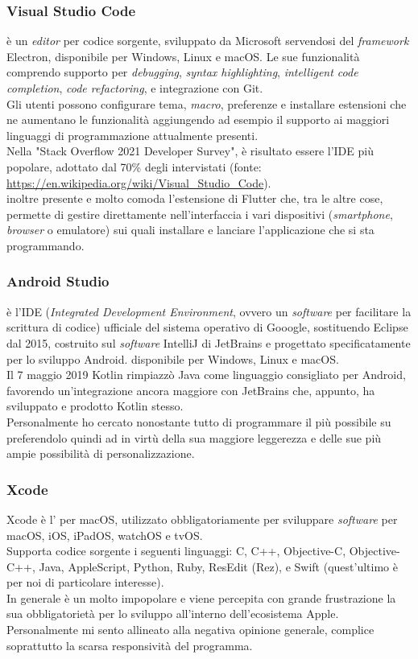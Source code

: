 \subsubsection{Visual Studio Code}
\vsc{} è un \textit{editor} per codice sorgente, sviluppato da Microsoft servendosi del \textit{framework} Electron, disponibile per Windows, Linux e macOS. Le sue funzionalità comprendo supporto per \textit{debugging}, \textit{syntax highlighting}, \textit{intelligent code completion}, \textit{code refactoring}, e integrazione con Git. \\
Gli utenti possono configurare tema, \textit{macro}, preferenze e installare estensioni che ne aumentano le funzionalità aggiungendo ad esempio il supporto ai maggiori linguaggi di programmazione attualmente presenti.\\
Nella "Stack Overflow 2021 Developer Survey", \vsc{} è risultato essere l'IDE più popolare, adottato dal 70\% degli intervistati (fonte: \url{https://en.wikipedia.org/wiki/Visual_Studio_Code}).\\
\e{} inoltre presente e molto comoda l'estensione di Flutter che, tra le altre cose, permette di gestire direttamente nell'interfaccia i vari dispositivi (\textit{smartphone}, \textit{browser} o emulatore) sui quali installare e lanciare l'applicazione che si sta programmando.

\subsubsection{Android Studio}
\astudio{} è l'IDE (\textit{Integrated Development Environment}, ovvero un \textit{software} per facilitare la scrittura di codice) ufficiale del sistema operativo di Gooogle, sostituendo Eclipse dal 2015, costruito sul \textit{software} IntelliJ di JetBrains e progettato specificatamente per lo sviluppo Android. \e{} disponibile per Windows, Linux e macOS.\\
Il 7 maggio 2019 Kotlin rimpiazzò Java come linguaggio consigliato per Android, favorendo un'integrazione ancora maggiore con JetBrains che, appunto, ha sviluppato e prodotto Kotlin stesso.\\
Personalmente ho cercato nonostante tutto di programmare il più possibile su \vsc{} preferendolo quindi ad \astudio{} in virtù della sua maggiore leggerezza e delle sue più ampie possibilità di personalizzazione.

\subsubsection{Xcode}
Xcode è l'\ide{} per macOS, utilizzato obbligatoriamente per sviluppare \textit{software} per macOS, iOS, iPadOS, watchOS e tvOS.\\
Supporta codice sorgente i seguenti linguaggi: C, C++, Objective-C, Objective-C++, Java, AppleScript, Python, Ruby, ResEdit (Rez), e Swift (quest'ultimo è per noi di particolare interesse).\\
In generale è un \ide{} molto impopolare e viene percepita con grande frustrazione la sua obbligatorietà per lo sviluppo all'interno dell'ecosistema Apple. Personalmente mi sento allineato alla negativa opinione generale, complice soprattutto la scarsa responsività del programma.


